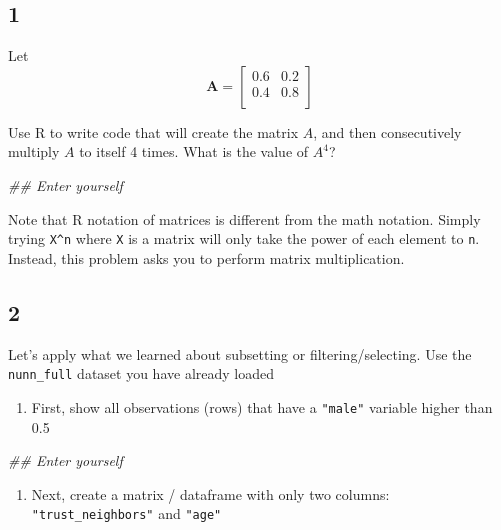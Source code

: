 \documentclass[
]{book}
\newenvironment{Shaded}{\begin{snugshade}}{\end{snugshade}}
\newcommand{\CommentTok}[1]{\textcolor[rgb]{0.56,0.35,0.01}{\textit{#1}}}
\providecommand{\tightlist}{%
  \setlength{\itemsep}{0pt}\setlength{\parskip}{0pt}}
\theoremstyle{definition}
\theoremstyle{definition}
\theoremstyle{definition}
\theoremstyle{remark}
\begin{document}
\hypertarget{section-9}{%
\subsection*{1}\label{section-9}}

Let
\[\mathbf{A} = \left[\begin{array}
{rrr}
0.6 & 0.2\\
0.4 & 0.8\\
\end{array}\right]
\]

Use R to write code that will create the matrix \(A\), and then consecutively multiply \(A\) to itself 4 times. What is the value of \(A^{4}\)?

\begin{Shaded}
\begin{Highlighting}[]
\CommentTok{\#\# Enter yourself}
\end{Highlighting}
\end{Shaded}

Note that R notation of matrices is different from the math notation. Simply trying \texttt{X\^{}n} where \texttt{X} is a matrix will only take the power of each element to \texttt{n}. Instead, this problem asks you to perform matrix multiplication.

\hypertarget{section-10}{%
\subsection*{2}\label{section-10}}

Let's apply what we learned about subsetting or filtering/selecting. Use the \texttt{nunn\_full} dataset you have already loaded

\begin{enumerate}
\def\labelenumi{\alph{enumi})}
\tightlist
\item
  First, show all observations (rows) that have a \texttt{"male"} variable higher than 0.5
\end{enumerate}

\begin{Shaded}
\begin{Highlighting}[]
\CommentTok{\#\# Enter yourself}
\end{Highlighting}
\end{Shaded}

\begin{enumerate}
\def\labelenumi{\alph{enumi})}
\setcounter{enumi}{1}
\tightlist
\item
  Next, create a matrix / dataframe with only two columns: \texttt{"trust\_neighbors"} and \texttt{"age"}
\end{enumerate}
\end{document}
